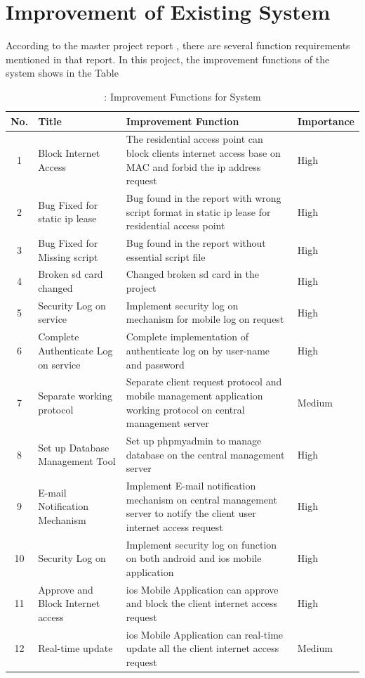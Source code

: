 \section{Improvement of Existing System}
\par According to the master project report \cite{TorgeirMR}, there are several function requirements mentioned in that report. In this project, the improvement functions of the system shows in the Table 
\begin{table}
\caption{\label{tab:improve_system_func}: Improvement Functions for System}
\centering
\begin{tabular}{| c | p{4cm} | p{6cm} | l |}
\hline
 No. & Title & Improvement Function & Importance \\ \hline
 1 & Block Internet Access & The residential access point can block clients internet access base on MAC and forbid the \gls{ip} address request & High \\
 2 & Bug Fixed for static \gls{ip} lease & Bug found in the report with wrong script format in static \gls{ip} lease for residential access point & High \\
 3 & Bug Fixed for Missing script & Bug found in the report without essential script file & High \\
 4 & Broken \gls{sd} card changed & Changed broken \gls{sd} card in the project & High \\ \hline
 5 & Security Log on service & Implement security log on mechanism for mobile log on request & High \\
 6 & Complete Authenticate Log on service & Complete implementation of authenticate log on by user-name and password & High \\
 7 & Separate working protocol & Separate client request protocol and mobile management application working protocol on central management server & Medium \\
 8 & Set up Database Management Tool & Set up phpmyadmin\cite{phpmyadmin} to manage database on the central management server & High \\
 9 & E-mail Notification Mechanism & Implement E-mail notification mechanism on central management server to notify the client user internet access request & High \\ \hline
 10 & Security Log on & Implement security log on function on both android and \gls{ios} mobile application & High \\
 11 & Approve and Block Internet access & \gls{ios} Mobile Application can approve and block the client internet access request & High \\
 12 & Real-time update & \gls{ios} Mobile Application can real-time update all the client internet access request & Medium \\ \hline
\end{tabular} 
\end{table}

